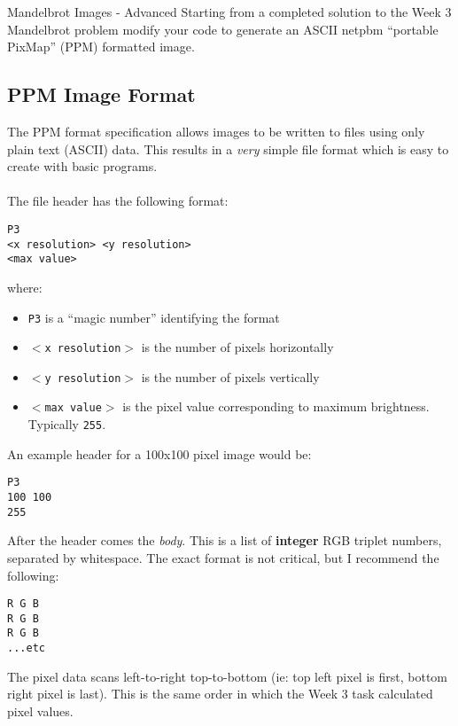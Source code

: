 \documentclass{lab}
\begin{document}
\pagebreak
\begin{task}{Mandelbrot Images - Advanced}{}
Starting from a completed solution to the Week 3 Mandelbrot problem modify your code to generate an ASCII netpbm ``portable PixMap'' (PPM) formatted image.
\subsection*{PPM Image Format}
The PPM format specification allows images to be written to files using only plain text (ASCII) data. This results in a \textit{very} simple file format which is easy to create with basic programs.\\
~\\
The file header has the following format:
\begin{lstlisting}[style=pseudo]
P3
<x resolution> <y resolution>
<max value>
\end{lstlisting}
where:
\begin{itemize}
	\item \texttt{P3} is a ``magic number'' identifying the format
	\item \texttt{$<$x resolution$>$} is the number of pixels horizontally
	\item \texttt{$<$y resolution$>$} is the number of pixels vertically
	\item \texttt{$<$max value$>$} is the pixel value corresponding to maximum brightness. Typically \texttt{255}.
\end{itemize}
An example header for a 100x100 pixel image would be:
\begin{lstlisting}[style=pseudo]
P3
100 100
255
\end{lstlisting}
After the header comes the \textit{body}. This is a list of \textbf{integer} RGB triplet numbers, separated by whitespace. The exact format is not critical, but I recommend the following:
\begin{lstlisting}[style=pseudo]
R G B
R G B
R G B
...etc
\end{lstlisting}
The pixel data scans left-to-right top-to-bottom (ie: top left pixel is first, bottom right pixel is last). This is the same order in which the Week 3 task calculated pixel values.


\end{task}
\end{document}
